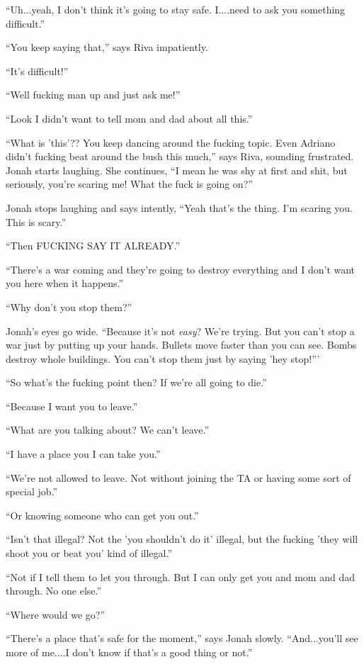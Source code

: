 ``Uh...yeah, I don't think it's going to stay safe.  I....need to ask you something difficult.''

``You keep saying that,'' says Riva impatiently.

``It's difficult!''

``Well fucking man up and just ask me!''

``Look I didn't want to tell mom and dad about all this.''

``What is 'this'??  You keep dancing around the fucking topic.  Even Adriano didn't fucking beat around the bush this much,'' says Riva, sounding frustrated.  Jonah starts laughing.   She continues, ``I mean he was shy at first and shit, but seriously, you're scaring me!  What the fuck is going on?''

Jonah stops laughing and says intently, ``Yeah that's the thing.  I'm scaring you.  This is scary.''

``Then FUCKING SAY IT ALREADY.''

``There's a war coming and they're going to destroy everything and I don't want you here when it happens.''

``Why don't you stop them?''

Jonah's eyes go wide.  ``Because it's not \textit{easy}?  We're trying.  But you can't stop a war just by putting up your hands.  Bullets move faster than you can see.  Bombs destroy whole buildings.  You can't stop them just by saying 'hey stop!'''

``So what's the fucking point then?  If we're all going to die.''

``Because I want you to leave.''

``What are you talking about?  We can't leave.''

``I have a place you I can take you.''

``We're not allowed to leave.  Not without joining the TA or having some sort of special job.''

``Or knowing someone who can get you out.''

``Isn't that illegal?  Not the 'you shouldn't do it' illegal, but the fucking 'they will shoot you or beat you' kind of illegal.''

``Not if I tell them to let you through.  But I can only get you and mom and dad through.  No one else.''

``Where would we go?''

``There's a place that's safe for the moment,'' says Jonah slowly.  ``And...you'll see more of me....I don't know if that's a good thing or not.''

